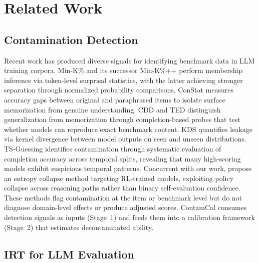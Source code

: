 \section{Related Work}
\label{sec:related_work}

\subsection{Contamination Detection}

Recent work has produced diverse signals for identifying benchmark data in LLM training corpora. Min-K\% \citep{shi_2023_minkprob} and its successor Min-K\%++ \citep{zhang_2024_minkpp} perform membership inference via token-level surprisal statistics, with the latter achieving stronger separation through normalized probability comparisons. ConStat \citep{dekoninck2024constat} measures accuracy gaps between original and paraphrased items to isolate surface memorization from genuine understanding. CDD and TED \citep{dong_2024_cdd} distinguish generalization from memorization through completion-based probes that test whether models can reproduce exact benchmark content. KDS \citep{choi_2025_kds} quantifies leakage via kernel divergence between model outputs on seen and unseen distributions. TS-Guessing \citep{deng_2024_tsguessing} identifies contamination through systematic evaluation of completion accuracy across temporal splits, revealing that many high-scoring models exhibit suspicious temporal patterns. Concurrent with our work, \citet{tao2025detecting} propose an entropy collapse method targeting RL-trained models, exploiting policy collapse across reasoning paths rather than binary self-evaluation confidence. These methods flag contamination at the item or benchmark level but do not diagnose domain-level effects or produce adjusted scores. ContamCal consumes detection signals as inputs (Stage~1) and feeds them into a calibration framework (Stage~2) that estimates decontaminated ability.

\subsection{IRT for LLM Evaluation}

